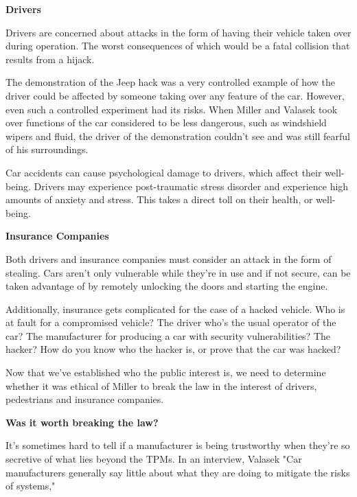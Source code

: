 \documentclass[12pt]{article}
\begin{document}
\begin{multicols}{2}
\vspace{.2cm}\textbf{Drivers}

 Drivers are concerned about attacks in the form of having their vehicle taken over during operation. \cite{officialPaper} The worst consequences of which would be a fatal collision that results from a hijack. 

The demonstration of the Jeep hack was a very controlled example of how the driver could be affected by someone taking over any feature of the car. However, even such a controlled experiment had its risks. When Miller and Valasek took over functions of the car considered to be less dangerous, such as windshield wipers and fluid, the driver of the demonstration couldn't see and was still fearful of his surroundings.\cite{dangerousJeepHack}\cite{wired}

Car accidents can cause psychological damage to drivers, which affect their well-being. Drivers may experience post-traumatic stress disorder and experience high amounts of anxiety and stress.\cite{trauma} This takes a direct toll on their health, or well-being. 

\vspace{.2cm}\textbf{Insurance Companies}

Both drivers and insurance companies must consider an attack in the form of stealing. Cars aren't only vulnerable while they're in use and if not secure, can be taken advantage of by remotely unlocking the doors and starting the engine. \cite{hackingRisk}

Additionally, insurance gets complicated for the case of a hacked vehicle. Who is at fault for a compromised vehicle? The driver who's the usual operator of the car? The manufacturer for producing a car with security vulnerabilities? The hacker? How do you know who the hacker is, or prove that the car was hacked?  \cite{alanna}

Now that we've established who the public interest is, we need to determine whether it was ethical of Miller to break the law in the interest of drivers, pedestrians and insurance companies.

\vspace{.2cm}\textbf{Was it worth breaking the law?}

It's sometimes hard to tell if a manufacturer is being trustworthy when they're so secretive of what lies beyond the TPMs. In an interview, Valasek "Car manufacturers generally say little about what they are doing to mitigate the risks of systems,"\cite{hackingRisk}


\end{multicols}
\end{document}
